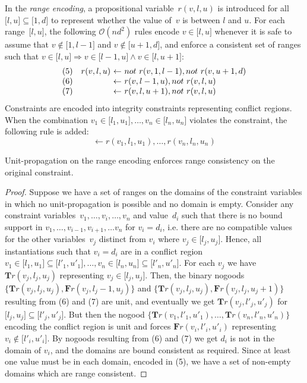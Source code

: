 \documentclass{tlp}
\newcommand{\tass}[1]{\mathbf{T}#1}
\newcommand{\fass}[1]{\mathbf{F}#1}
\newcommand{\dneg}{not\ }
\begin{document}
In the \emph{range encoding}, a propositional variable~$r(v, l, u)$ is introduced for all $\lbrack l, u \rbrack \subseteq \lbrack 1, d \rbrack$ to represent whether the value of~$v$ is between $l$ and $u$. For each range~$\lbrack l, u \rbrack$, the following $\mathcal{O}(nd^2)$ rules encode $v \in \lbrack l , u \rbrack$ whenever it is safe to assume that $v \not\in \lbrack 1, l-1 \rbrack$ and $v \not\in \lbrack u+1, d\rbrack$, and enforce a consistent set of ranges such that $v \in \lbrack l, u\rbrack \Rightarrow v \in \lbrack l-1, u\rbrack \land v \in \lbrack l, u+1\rbrack$:
\[
\begin{array}{lr@{\ \leftarrow\ }l}
(5) & r(v, l, u) & \dneg r(v, 1, l-1), \dneg r(v, u+1, d) \\
(6) & & r(v, l-1, u), \dneg r(v, l, u) \\
(7) & & r(v, l, u+1), \dneg r(v, l, u)
\end{array}
\]
Constraints are encoded into integrity constraints representing conflict regions. When the combination $v_1 \in \lbrack l_1, u_1\rbrack, \dots, v_n \in \lbrack l_n, u_n\rbrack$ violates the constraint, the following rule is added:
\[
\leftarrow r(v_1, l_1, u_1), \dots, r(v_n, l_n, u_n)
\]
\begin{theorem} \label{thm:rng}
Unit-propagation on the range encoding enforces range consistency on the original constraint.
\end{theorem}
\begin{proof}
Suppose we have a set of ranges on the domains of the constraint variables in which no unit-propagation is possible and no domain is empty.
Consider any constraint variables~$v_1, \dots, v_i, \dots, v_n$ and value~$d_i$ such that there is no bound support in $v_1, \dots, v_{i-1}, v_{i+1}, \dots v_n$ for $v_i = d_i$, i.e. there are no compatible values for the other variables~$v_j$ distinct from $v_i$ where $v_j \in \lbrack l_j, u_j \rbrack$. Hence, all instantiations such that $v_i = d_i$ are in a conflict region $v_1 \in \lbrack l_1, u_1 \rbrack \subseteq \lbrack l'_1, u'_1 \rbrack, \dots, v_n \in \lbrack l_n, u_n \rbrack \subseteq \lbrack l'_n, u'_n \rbrack$. For each $v_j$ we have $\tass{r(v_j,l_j,u_j)}$ representing $v_j \in \lbrack l_j, u_j \rbrack$. Then, the binary nogoods $\{\tass{r(v_j,l_j,u_j)}, \fass{r(v_j,l_j-1,u_j)}\}$ and $\{\tass{r(v_j,l_j,u_j)}, \fass{r(v_j,l_j,u_j+1)}\}$ resulting from (6) and (7) are unit, and eventually we get $\tass{r(v_j,l'_j,u'_j)}$ for $\lbrack l_j, u_j \rbrack \subseteq \lbrack l'_j, u'_j \rbrack$. But then the nogood $\{ \tass{r(v_1, l'_1,u'_1)}, \dots, \tass{r(v_n, l'_n, u'_n)} \}$ encoding the conflict region is unit and forces $\fass{r(v_i,l'_i,u'_i)}$ representing $v_i \not\in \lbrack l'_i, u'_i \rbrack$. By nogoods resulting from (6) and (7) we get $d_i$ is not in the domain of $v_i$, and the domains are bound consistent as required.
Since at least one value must be in each domain, encoded in (5), we have a set of non-empty domains which are range consistent.
\end{proof}
\end{document}
